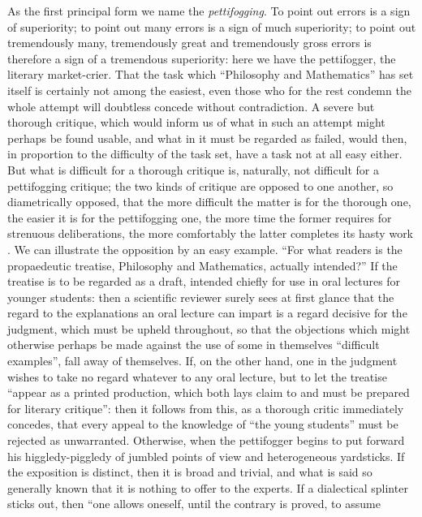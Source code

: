 \documentclass[12pt,a4paper,openany]{book}
\newcommand{\opage}[1]{\marginnote{\footnotesize\textit{[#1]}}}
\begin{document}
As the first principal form we name the \emph{pettifogging}. To
point out errors is a sign of superiority; to point out
many errors is a sign of much superiority; to point out tremendously many, tremendously great and tremendously gross errors is
therefore a sign of a tremendous superiority: here we have the
pettifogger, the literary market-crier. That the task which
``Philosophy and Mathematics'' has set itself is certainly not among
the easiest, even those who for the rest
condemn the whole attempt will doubtless concede without contradiction. A severe but thorough critique, which would inform
us of what in such an attempt might perhaps be found
usable, and what in it must be regarded as failed, would
then, in proportion to the difficulty of the task set, have
a task not at all easy either. But what is difficult for a
thorough critique is, naturally, not difficult for a pettifogging critique; the two kinds of critique are opposed to one another, so diametrically opposed, that the more difficult the matter
is for the thorough one, the easier it is for the pettifogging one, the more time the former requires for strenuous deliberations, the more comfortably the latter completes its hasty work
. We can illustrate the opposition by an easy example. ``For what readers is the propaedeutic treatise,
Philosophy and Mathematics, actually intended?'' If the treatise is to be regarded as a draft, intended chiefly for
\opage{5}\setcounter{footnote}{0}%
use in oral lectures for younger students:
then a scientific reviewer surely sees at first glance that the regard to the explanations an oral lecture can impart is a regard decisive for the judgment, which must be upheld throughout, so that the objections
which might otherwise perhaps be made against the use of
some in themselves ``difficult examples'', fall away of themselves.
If, on the other hand, one in the judgment wishes to take no
regard whatever to any oral lecture, but to let the treatise ``appear as a printed production, which both lays
claim to and must be prepared for literary critique'': then
it follows from this, as a thorough critic immediately concedes, that every appeal to the knowledge of ``the young students'' must be rejected as unwarranted. Otherwise,
when the pettifogger begins to put forward his higgledy-piggledy
of jumbled points of view and heterogeneous yardsticks.
If the exposition is distinct, then it is broad and trivial, and
what is said so generally known that it is nothing
to offer to the experts. If a dialectical splinter sticks out, then
``one allows oneself, until the contrary is proved, to assume
\end{document}
